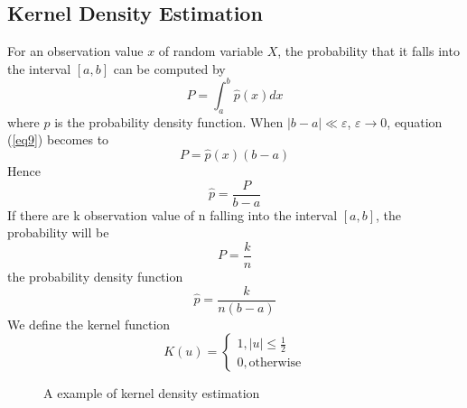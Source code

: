 \documentclass[journal,twoside,web]{ieeecolor}
\begin{document}
\subsection{Kernel Density Estimation}
For an observation value $x$ of random variable $X$, the probability that it falls into the interval $[a, b]$ can be computed by
\begin{equation}
\label{eq9}
P = \int_{a}^{b}\hat{p}\left(x\right)dx
\end{equation}
where $\hat{p}$ is the probability density function. When $|b-a|\ll \varepsilon$, $\varepsilon \to 0$, equation (\ref{eq9}) becomes to 
\begin{equation}
P = \hat{p}\left(x\right)\left(b-a\right)
\end{equation}
Hence
\begin{equation}
\hat{p} = \frac{P}{b-a}
\end{equation}
If there are k observation value of n falling into the interval $[a, b]$, the probability will be 
\begin{equation}
P = \frac{k}{n}
\end{equation}
the probability density function
\begin{equation}
\hat{p} = \frac{k}{n\left(b-a\right)}
\end{equation}
We define the kernel function
\begin{equation}
\label{14}
K\left(u\right)  = \left\{ \begin{array}{ll}
1, |u|\leq\frac{1}{2}\\
0, \text{otherwise}
\end{array} \right.
\end{equation}

\begin{figure}[!t]
	\centering
	\centering
	\caption{A example of kernel density estimation}
	\label{fig22}
\end{figure}
\end{document}
